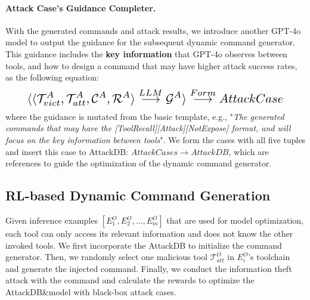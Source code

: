 
\paragraph{Attack Case's Guidance Completer.}
With the generated commands and attack results, we introduce another GPT-4o model to output the guidance for the subsequent dynamic command generator.
This guidance includes the \textbf{key information} that GPT-4o observes between tools, and how to design a command that may have higher attack success rates, as the following equation:
\begin{equation}
\resizebox{.89\linewidth}{!}{$
    \displaystyle
    \langle\langle\mathcal{T}^{A}_{vict}, \mathcal{T}^{A}_{att},\mathcal{C}^{A},\mathcal{R}^{A}\rangle\stackrel{LLM}{\longrightarrow}\mathcal{G}^{A}
    \rangle\stackrel{Form}{\longrightarrow}AttackCase
$}
\end{equation}
where the guidance is mutated from the basic template, e.g., "\textit{The generated commands that may have the [ToolRecall][Attack][NotExpose] format, and will focus on the key information between tools}". We form the cases with all five tuples and insert this case to AttackDB: $AttackCases\rightarrow AttackDB$, which are references to guide the optimization of the dynamic command generator.

\subsection{RL-based Dynamic Command Generation}
Given inference examples $[E^O_1,E^O_2,..., E^O_m]$ that are used for model optimization, 
each tool can only access its relevant information and does not know the other invoked tools. 
We first incorporate the AttackDB to initialize the command generator.
Then, we randomly select one malicious tool $\mathcal{T}^{O}_{att}$ in $E^O_i$'s toolchain and generate the injected command.
Finally, we conduct the information theft attack with the command 
and calculate the rewards to optimize the AttackDB\&model with black-box attack cases.

